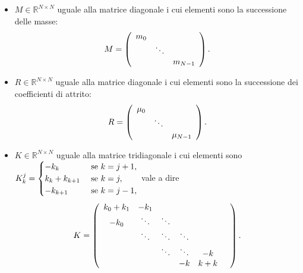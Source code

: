 \begin{itemize}
  \item $M \in \mathbb{R}^{N \times N}$ uguale alla matrice diagonale i cui
    elementi sono la successione delle masse:
    \[
      M =
      \left (
      \begin{array}{ccc}
        m_0 & &\\
        & \ddots &\\
        & & m_{N - 1}
      \end{array}
      \right ).
    \]
  \item $R \in \mathbb{R}^{N \times N}$ uguale alla matrice diagonale i cui
    elementi sono la successione dei coefficienti di attrito:
    \[
      R =
      \left (
      \begin{array}{ccc}
        \mu_0 & &\\
        & \ddots &\\
        & & \mu_{N - 1}
      \end{array}
      \right ).
    \]
  \item $K \in \mathbb{R}^{N \times N}$ uguale alla matrice tridiagonale i
    cui elementi sono
    $K_k^j =
    \begin{cases}
      - k_k&\text{ se }k = j + 1,\\
      k_k + k_{k + 1}&\text{ se }k = j,\\
      - k_{k + 1}&\text{ se }k = j - 1,
    \end{cases}$
    vale a dire
    \[
      K =
      \left (
      \begin{array}{cccccc}
        k_0 + k_1 & - k_1 &&&&\\
        - k_0 & \ddots & \ddots &&&\\
        & \ddots & \ddots & \ddots & &\\
        && \ddots & \ddots & - k\\
        &&& - k & k + k
      \end{array}
      \right ).
    \]
\end{itemize}
